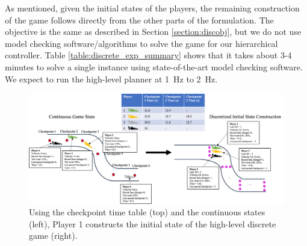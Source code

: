 As mentioned, given the initial states of the players, the remaining construction of the game follows directly from the other parts of the formulation. The objective is the same as described in Section \ref{section:discobj}, but we do not use model checking software/algorithms to solve the game for our hierarchical controller. Table \ref{table:discrete_exp_summary} shows that it takes about 3-4 minutes to solve a single instance using state-of-the-art model checking software. We expect to run the high-level planner at \SI{1}{\hertz} to \SI{2}{\hertz}.

\begin{figure}
  \centering
    \includegraphics[width=\textwidth]{Figures/DiscreteInitialization.png}
  \caption[High-level planner discrete game initialization]{Using the checkpoint time table (top) and the continuous states (left), Player 1 constructs the initial state of the high-level discrete game (right).}
  \label{fig:disc_construct}
\end{figure}

